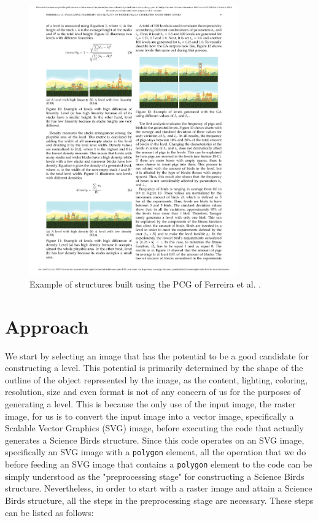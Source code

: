 \documentclass{dalthesis}
\begin{document}
\begin{figure}
\begin{center}
	\includegraphics[width=9cm]{./Ferreira.pdf}
\caption{Example of structures built using the PCG of Ferreira et al. \cite{ferreira18}.}
\label{fig:ferreiraEg}
\end{center}
\end{figure}

\chapter{Approach}\label{sec:approach}

We start by selecting an image that has the potential to be a good candidate for constructing a level. This potential is primarily determined by the shape of the outline of the object represented by the image, as the content, lighting, coloring, resolution, size and even format is not of any concern of us for the purposes of generating a level. This is because the only use of the input image, the raster image, for us is to convert the input image into a vector image, specifically a Scalable Vector Graphics (SVG) image, before executing the code that actually generates a Science Birds structure. Since this code operates on an SVG image, specifically an SVG image with a \lstinline{polygon} element, all the operation that we do before feeding an SVG image that contains a \lstinline{polygon} element to the code can be simply understood as the "preprocessing stage" for constructing a Science Birds structure. Nevertheless, in order to start with a raster image and attain a Science Birds structure, all the steps in the preprocessing stage are necessary. These steps can be listed as follows:
\end{document}
